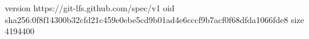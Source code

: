 version https://git-lfs.github.com/spec/v1
oid sha256:0f8f14300b32cfd21c459e0ebe5cd9b01ad4e6cccf9b7acf0f68dfda1066fde8
size 4194400
